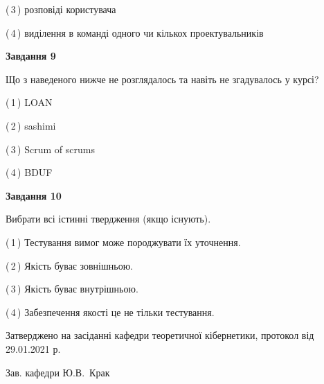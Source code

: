 \documentclass[10pt, ukrainian]{article}
\begin{document}
{\begin {large}
(\,3\,) розповіді користувача%



(\,4\,) виділення в команді одного чи кількох проектувальників%


{\begin {center}\textbf{Завдання 9}\end {center}}\par
Що з наведеного нижче не розглядалось та навіть не згадувалось у курсі?\par
\vspace{2mm}



(\,1\,) LOAN%



(\,2\,) sashimi%



(\,3\,) Scrum of scrums%



(\,4\,) BDUF%


{\begin {center}\textbf{Завдання 10}\end {center}}\par
Вибрати всі істинні твердження (якщо існують).\par
\vspace{2mm}



(\,1\,) Тестування вимог може породжувати їх уточнення.%



(\,2\,) Якість буває зовнішньою.%



(\,3\,) Якість буває внутрішньою.%



(\,4\,) Забезпечення якості це не тільки тестування.%



\end {large}}
{\vspace{5mm}\smallskip \begin {small} Затверджено на засіданні кафедри теоретичної кібернетики, протокол  від   29.01.2021 р.\par\smallskip\smallskip
{\parbox {6.5 cm}{Зав. кафедри \dotfill Ю.В.~Крак}} \end{small}}
\newpage
\end{document}
